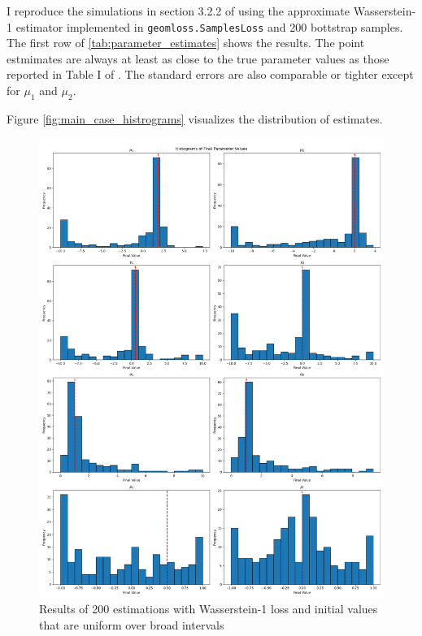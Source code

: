 I reproduce the simulations in section 3.2.2 of \textcite{kaji2023adversarial} using the approximate Wasserstein-1 estimator implemented in \texttt{geomloss.SamplesLoss} and 200 bottstrap samples.
The first row of \ref{tab:parameter_estimates} shows the results.
The point estmimates are always at least as close to the true parameter values as those reported in Table I of \cite{kaji2023adversarial}.
The standard errors are also comparable or tighter except for $\mu_1$ and $\mu_2$.

Figure \ref{fig:main_case_histrograms} visualizes the distribution of estimates.

\begin{figure}
    \includegraphics[width=\textwidth]{./Images/wide_uniform_histograms.png}
    \caption{Results of 200 estimations with Wasserstein-1 loss and initial values that are uniform over broad intervals}
    \label{fig:wide_uniform_histograms}
\end{figure}

